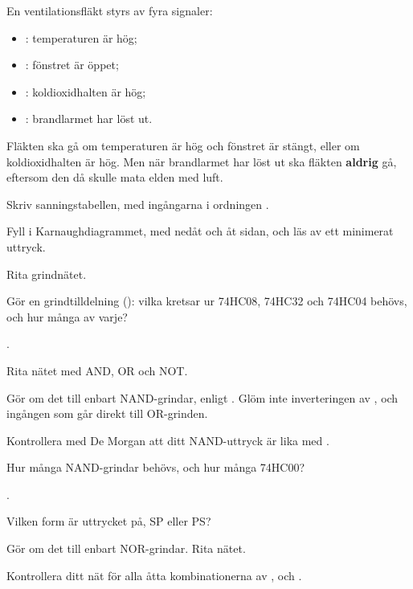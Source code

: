 \label{c4:ex:8}
En ventilationsfläkt  styrs av fyra signaler:
\begin{itemize}
  \item {}: temperaturen är hög;
  \item {}: fönstret är öppet;
  \item {}: koldioxidhalten är hög;
  \item {}: brandlarmet har löst ut.
\end{itemize}
Fläkten ska gå om temperaturen är hög och fönstret är stängt, eller om koldioxidhalten är hög. Men
när brandlarmet har löst ut ska fläkten \textbf{aldrig} gå, eftersom den då skulle mata elden med
luft.
\begin{parts}
  \item Skriv sanningstabellen, med ingångarna i ordningen .
  \item Fyll i Karnaughdiagrammet, med  nedåt och  åt sidan, och läs av ett
    minimerat uttryck.
  \item Rita grindnätet.
  \item Gör en grindtilldelning (): vilka kretsar ur 74HC08, 74HC32 och 74HC04
    behövs, och hur många av varje?
\end{parts}

\label{c4:ex:9}
.
\begin{parts}
  \item Rita nätet med AND, OR och NOT.
  \item Gör om det till enbart NAND-grindar, enligt . Glöm inte inverteringen av
    , och ingången  som går direkt till OR-grinden.
  \item Kontrollera med De Morgan att ditt NAND-uttryck är lika med .
  \item Hur många NAND-grindar behövs, och hur många 74HC00?
\end{parts}

\label{c4:ex:10}
.
\begin{parts}
  \item Vilken form är uttrycket på, SP eller PS?
  \item Gör om det till enbart NOR-grindar. Rita nätet.
  \item Kontrollera ditt nät för alla åtta kombinationerna av ,  och .
\end{parts}

